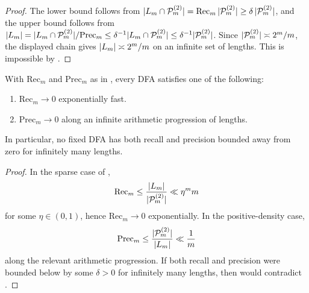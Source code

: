 \begin{proof}
  The lower bound follows from
  \(\lvert L_m\cap\mathcal P_m^{(2)} \rvert=\mathrm{Rec}_m\,\lvert \mathcal P_m^{(2)} \rvert\ge\delta\,\lvert \mathcal P_m^{(2)} \rvert\),
  and the upper bound follows from
  \(\lvert L_m \rvert=\lvert L_m\cap\mathcal P_m^{(2)} \rvert/\mathrm{Prec}_m\le\delta^{-1}\lvert L_m\cap\mathcal P_m^{(2)} \rvert\le\delta^{-1}\lvert \mathcal P_m^{(2)} \rvert\).
  Since \(\lvert \mathcal P_m^{(2)} \rvert\asymp 2^m/m\), the displayed chain
  gives \(\lvert L_m \rvert\asymp 2^m/m\) on an infinite set of lengths. This
  is impossible by .
\end{proof}

\begin{corollary}
  \label{cor:dfa-prime-recall-precision}
  With \(\mathrm{Rec}_m\) and \(\mathrm{Prec}_m\) as in
  , every DFA satisfies one of
  the following:
  \begin{enumerate}[label=\textup{(\roman*)}]
    \item \(\mathrm{Rec}_m\to 0\) exponentially fast.
    \item \(\mathrm{Prec}_m\to 0\) along an infinite arithmetic
    progression of lengths.
  \end{enumerate}
  In particular, no fixed DFA has both recall and precision bounded
  away from zero for infinitely many lengths.
\end{corollary}

\begin{proof}
  In the sparse case of ,
  \[
    \mathrm{Rec}_m
    \le \frac{\lvert L_m \rvert}{\lvert \mathcal P_m^{(2)} \rvert}
    \ll \eta^m m
  \]
  for some \(\eta\in(0,1)\), hence \(\mathrm{Rec}_m\to 0\)
  exponentially. In the positive-density case,
  \[
    \mathrm{Prec}_m
    \le \frac{\lvert \mathcal P_m^{(2)} \rvert}{\lvert L_m \rvert}
    \ll \frac{1}{m}
  \]
  along the relevant arithmetic progression. If both recall and
  precision were bounded below by some \(\delta>0\) for infinitely many
  lengths, then  would
  contradict .
\end{proof}
